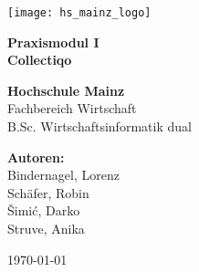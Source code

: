 \begin{titlepage}
    \centering
    \vspace*{1cm}

    \texttt{[image: hs\_mainz\_logo]}\\
    \vspace{1.5cm}

    \textbf{\LARGE Praxismodul I}\\
    \vspace{0.5cm}
    \textbf{\Large Collectiqo}\\
    \vspace{1.5cm}

    \textbf{Hochschule Mainz}\\
    \vspace{0.5cm}
    Fachbereich Wirtschaft\\
    \vspace{0.5cm}
    B.Sc. Wirtschaftsinformatik dual\\
    \vspace{1.5cm}

    \textbf{Autoren:}\\
    Bindernagel, Lorenz\\
    Schäfer, Robin\\
    Šimić, Darko\\
    Struve, Anika\\
    \vfill

    \today
\end{titlepage}